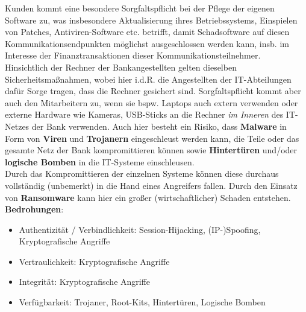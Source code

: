 Kunden kommt eine besondere Sorgfaltspflicht bei der Pflege der eigenen Software zu, was insbesondere Aktualisierung ihres Betriebssystems, Einspielen von Patches, Antiviren-Software {etc.} betrifft, damit Schadsoftware auf diesen Kommunikationsendpunkten möglichst ausgeschlossen werden kann, {insb.} im Interesse der Finanztransaktionen dieser Kommunikationsteilnehmer.\\
Hinsichtlich der Rechner der Bankangestellten gelten dieselben Sicherheitsmaßnahmen, wobei hier i.d.R. die Angestellten der IT-Abteilungen dafür Sorge tragen, dass die Rechner gesichert sind. Sorgfaltspflicht kommt aber auch den Mitarbeitern zu, wenn sie {bspw.} Laptops auch extern verwenden oder externe Hardware wie Kameras, USB-Sticks an die Rechner \textit{im Inneren} des IT-Netzes der Bank verwenden.
Auch hier besteht ein Risiko, dass \textbf{Malware} in Form von \textbf{Viren} und \textbf{Trojanern} eingeschleust werden kann, die Teile oder das gesamte Netz der Bank kompromittieren können sowie \textbf{Hintertüren} und/oder \textbf{logische Bomben} in die IT-Systeme einschleusen.\\
Durch das Kompromittieren der einzelnen Systeme können diese durchaus vollständig (unbemerkt) in die Hand eines Angreifers fallen.
Durch den Einsatz von \textbf{Ransomware} kann hier ein großer (wirtschaftlicher) Schaden entstehen.\\


\noindent
\textbf{Bedrohungen}:
\begin{itemize}
    \itemsep0.5em
    \item Authentizität / Verbindlichkeit: Session-Hijacking, (IP-)Spoofing, Kryptografische Angriffe
    \item Vertraulichkeit: Kryptografische Angriffe
    \item Integrität: Kryptografische Angriffe
    \item Verfügbarkeit: Trojaner, Root-Kits, Hintertüren, Logische Bomben
\end{itemize}

